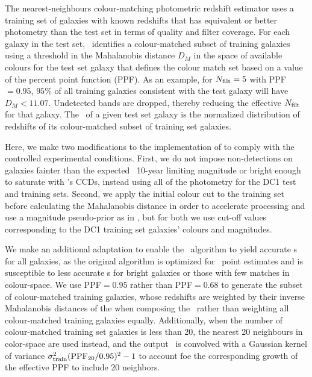 The nearest-neighbours colour-matching photometric redshift estimator \citep[\cmnn][]{Graham:17} uses a training set of galaxies with known redshifts that has equivalent or better photometry than the test set in terms of quality and filter coverage.
For each galaxy in the test set, \cmnn\ identifies a colour-matched subset of training galaxies using a threshold in the Mahalanobis distance $D_M$ in the space of available colours for the test set galaxy
that defines the colour match set based on a value of the percent point function (PPF).
As an example, for $N_{\rm{filt}}=5$ with PPF$=0.95$, $95\%$ of all training galaxies consistent with the test galaxy will have $D_M < 11.07$.
Undetected bands are dropped, thereby reducing the effective $N_{\rm{filt}}$ for that galaxy.
The \pzpdf\ of a given test set galaxy is the normalized distribution of redshifts of its colour-matched subset of training set galaxies.

Here, we make two modifications to the implementation of \citet{Graham:17} to comply with the controlled experimental conditions.
First, we do not impose non-detections on galaxies fainter than the expected \lsst\ 10-year limiting magnitude or bright enough to saturate with \lsst's CCDs, instead using all of the photometry for the DC1 test and training sets.
Second, we apply the initial colour cut to the training set before calculating the Mahalanobis distance in order to accelerate processing and use a magnitude pseudo-prior as in \citet{Graham:17}, but for both we use cut-off values corresponding to the DC1 training set galaxies' colours and magnitudes.

We make an additional adaptation to enable the \cmnn\ algorithm to yield accurate \pzpdf s for all galaxies, as the original \citet{Graham:17} algorithm is optimized for \pz\ point estimates and is susceptible to less accurate \pzpdf s for bright galaxies or those with few matches in colour-space.
We use PPF$=0.95$ rather than PPF$=0.68$ to generate the subset of colour-matched training galaxies, whose redshifts are weighted by their inverse Mahalanobis distances of the when composing the \pzpdf\ rather than weighting all colour-matched training galaxies equally.
Additionally, when the number of colour-matched training set galaxies is less than 20, the nearest 20 neighbours in color-space are used instead, and the output \pzpdf\ is convolved with a Gaussian kernel of variance $\sigma_{\rm train}^{2}({\rm PPF}_{20}/0.95)^2 -1$ to account foe the corresponding growth of the effective PPF to include 20 neighbors.

